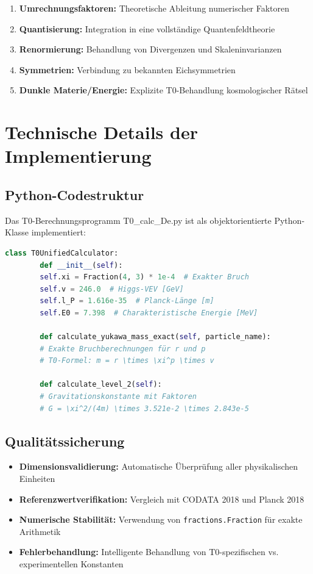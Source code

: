 	\begin{enumerate}
		\item \textbf{Umrechnungsfaktoren:} Theoretische Ableitung numerischer Faktoren
		\item \textbf{Quantisierung:} Integration in eine vollständige Quantenfeldtheorie
		\item \textbf{Renormierung:} Behandlung von Divergenzen und Skaleninvarianzen
		\item \textbf{Symmetrien:} Verbindung zu bekannten Eichsymmetrien
		\item \textbf{Dunkle Materie/Energie:} Explizite T0-Behandlung kosmologischer Rätsel
	\end{enumerate}
	
	\section{Technische Details der Implementierung}
	
	\subsection{Python-Codestruktur}
	
	Das T0-Berechnungsprogramm T0\_calc\_De.py ist als objektorientierte Python-Klasse implementiert:
	
	\begin{lstlisting}[language=Python, basicstyle=\small\ttfamily]
		class T0UnifiedCalculator:
		def __init__(self):
		self.xi = Fraction(4, 3) * 1e-4  # Exakter Bruch
		self.v = 246.0  # Higgs-VEV [GeV]
		self.l_P = 1.616e-35  # Planck-Länge [m]
		self.E0 = 7.398  # Charakteristische Energie [MeV]
		
		def calculate_yukawa_mass_exact(self, particle_name):
		# Exakte Bruchberechnungen für r und p
		# T0-Formel: m = r \times \xi^p \times v
		
		def calculate_level_2(self):
		# Gravitationskonstante mit Faktoren
		# G = \xi^2/(4m) \times 3.521e-2 \times 2.843e-5
	\end{lstlisting}
	
	\subsection{Qualitätssicherung}
	
	\begin{itemize}
		\item \textbf{Dimensionsvalidierung:} Automatische Überprüfung aller physikalischen Einheiten
		\item \textbf{Referenzwertverifikation:} Vergleich mit CODATA 2018 und Planck 2018
		\item \textbf{Numerische Stabilität:} Verwendung von \texttt{fractions.Fraction} für exakte Arithmetik
		\item \textbf{Fehlerbehandlung:} Intelligente Behandlung von T0-spezifischen vs. experimentellen Konstanten
	\end{itemize}
	
